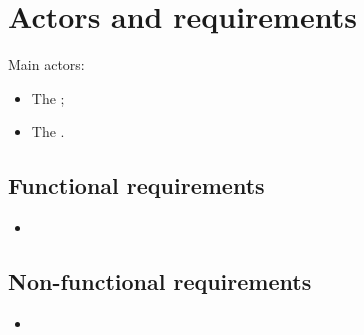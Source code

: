 \chapter{Actors and requirements}\label{ch:requirements}

Main actors:
\begin{itemize}
	\item The ;
	\item The .
\end{itemize}

\section{Functional requirements}\label{sec:functionalrequirements}

\begin{itemize}
	\item \textellipsis
\end{itemize}

\section{Non-functional requirements}\label{sec:nonfunctionalrequirements}

\begin{itemize}
	\item \textellipsis
\end{itemize}
